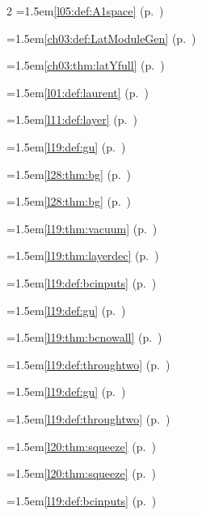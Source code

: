 \begin{multicols}{2}
\hangindent=1.5em\quad \ref{l05:def:A1space} (p.~\pageref{l05:def:A1space})\par
\hangindent=1.5em\quad \ref{ch03:def:LatModuleGen} (p.~\pageref{ch03:def:LatModuleGen})\par
\hangindent=1.5em\quad \ref{ch03:thm:latYfull} (p.~\pageref{ch03:thm:latYfull})\par
\hangindent=1.5em\quad \ref{l01:def:laurent} (p.~\pageref{l01:def:laurent})\par
\hangindent=1.5em\quad \ref{l11:def:layer} (p.~\pageref{l11:def:layer})\par
\hangindent=1.5em\quad \ref{l19:def:gu} (p.~\pageref{l19:def:gu})\par
\hangindent=1.5em\quad \ref{l28:thm:bg} (p.~\pageref{l28:thm:bg})\par
\hangindent=1.5em\quad \ref{l28:thm:bg} (p.~\pageref{l28:thm:bg})\par
\hangindent=1.5em\quad \ref{l19:thm:vacuum} (p.~\pageref{l19:thm:vacuum})\par
\hangindent=1.5em\quad \ref{l19:thm:layerdec} (p.~\pageref{l19:thm:layerdec})\par
\hangindent=1.5em\quad \ref{l19:def:bcinputs} (p.~\pageref{l19:def:bcinputs})\par
\hangindent=1.5em\quad \ref{l19:def:gu} (p.~\pageref{l19:def:gu})\par
\hangindent=1.5em\quad \ref{l19:thm:bcnowall} (p.~\pageref{l19:thm:bcnowall})\par
\hangindent=1.5em\quad \ref{l19:def:throughtwo} (p.~\pageref{l19:def:throughtwo})\par
\hangindent=1.5em\quad \ref{l19:def:gu} (p.~\pageref{l19:def:gu})\par
\hangindent=1.5em\quad \ref{l19:def:throughtwo} (p.~\pageref{l19:def:throughtwo})\par
\hangindent=1.5em\quad \ref{l20:thm:squeeze} (p.~\pageref{l20:thm:squeeze})\par
\hangindent=1.5em\quad \ref{l20:thm:squeeze} (p.~\pageref{l20:thm:squeeze})\par
\hangindent=1.5em\quad \ref{l19:def:bcinputs} (p.~\pageref{l19:def:bcinputs})\par

\end{multicols}
